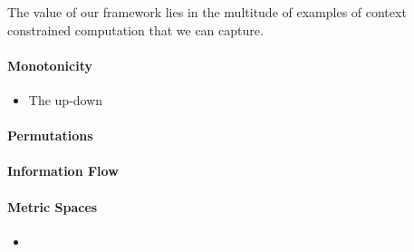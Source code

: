 The value of our framework lies in the multitude of examples of
context constrained computation that we can capture.

\paragraph{Monotonicity}
\begin{itemize}
\item The up-down 
\end{itemize}

\paragraph{Permutations}

\paragraph{Information Flow}

\paragraph{Metric Spaces}
\begin{itemize}
\item 
\end{itemize}


